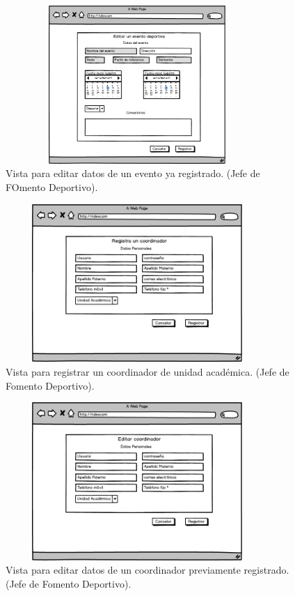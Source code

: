 		\begin{figure} [hbt!]
			\centering
			\includegraphics[width=10cm, height=6cm]{Imagenes/Nuevos/P5_Editar_evento_deportivo}
			\caption{Vista para editar datos de un evento ya registrado. (Jefe de FOmento Deportivo).}
			\label{editarevento}
		\end{figure}
	
		\begin{figure} [hbt!]
			\centering
			\includegraphics[width=10cm, height=6cm]{Imagenes/Nuevos/P6_Registro_coordinador}
			\caption{Vista para registrar un coordinador de unidad académica. (Jefe de Fomento Deportivo).}
			\label{registrarcoord}
		\end{figure}
		
		\begin{figure} [hbt!]
			\centering
			\includegraphics[width=10cm, height=6cm]{Imagenes/Nuevos/P7_Editar_coordinador}
			\caption{Vista para editar datos de un coordinador previamente registrado. (Jefe de Fomento Deportivo).}
			\label{editarcoord}
		\end{figure}
\pagebreak


